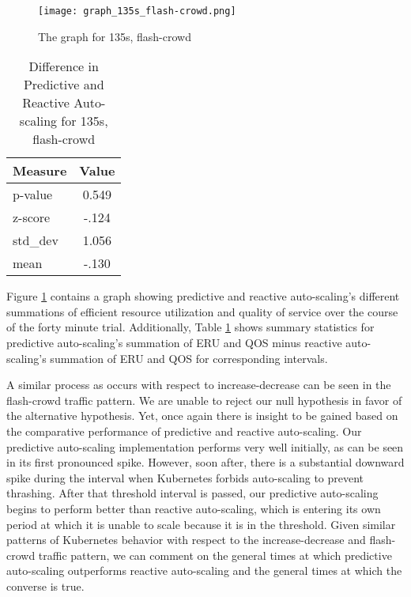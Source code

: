 \begin{figure}[!h]
  \centerline{\texttt{[image: graph\_135s\_flash-crowd.png]}}
  \caption{The graph for 135s, flash-crowd}
  \label{fig:135s-flash-crowd}
\end{figure}

\begin{table}[htbp]
  \centering
  \caption{Difference in Predictive and Reactive Auto-scaling for 135s, flash-crowd}
  \label{tab:135s-flash-crowd}
\begin{tabular}{l c}\hline\hline
    \multicolumn{1}{c}{\textbf{Measure}} & \textbf{Value} \\ \hline
     p-value & 0.549 \\
     z-score & -.124 \\
     std\_dev & 1.056 \\
     mean & -.130
  \end{tabular}
\end{table}

Figure \ref{fig:135s-flash-crowd} contains a graph
showing predictive and reactive auto-scaling's different
summations of efficient resource utilization and quality of service over the
course of the forty minute trial. Additionally, Table
\ref{tab:135s-flash-crowd} shows summary statistics for predictive
auto-scaling's summation of ERU and QOS minus reactive auto-scaling's summation
of ERU and QOS for corresponding intervals.

A similar process as occurs with respect to increase-decrease can be seen in the
flash-crowd traffic pattern. We are unable to reject our null hypothesis in
favor of the alternative hypothesis. Yet, once again there is insight to be
gained based on the comparative performance of predictive and reactive
auto-scaling. Our predictive auto-scaling implementation performs
very well initially, as can be seen in its first pronounced spike. However, soon
after, there is a substantial downward spike during the interval when Kubernetes
forbids auto-scaling to prevent thrashing. After that threshold interval is
passed, our predictive auto-scaling begins to perform better than reactive
auto-scaling, which is entering its own period at which it is unable to scale
because it is in the threshold. Given similar patterns of Kubernetes behavior
with respect to the increase-decrease and flash-crowd traffic pattern, we can
comment on the general times at which predictive auto-scaling outperforms
reactive auto-scaling and the general times at which the converse is true.
